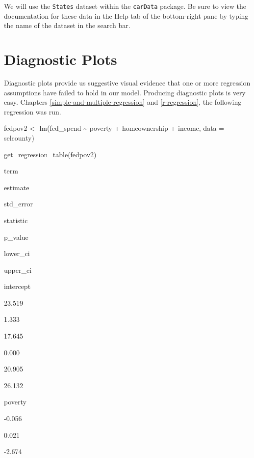 \documentclass[
]{book}
\makeatletter
\newenvironment{Shaded}{\begin{snugshade}}{\end{snugshade}}
\newcommand{\AttributeTok}[1]{\textcolor[rgb]{0.61,0.61,0.61}{#1}}
\newcommand{\FunctionTok}[1]{\textcolor[rgb]{0,0,0}{#1}}
\newcommand{\NormalTok}[1]{#1}
\newcommand{\OtherTok}[1]{\textcolor[rgb]{0.37,0.37,0.37}{#1}}
\newcommand{\SpecialCharTok}[1]{\textcolor[rgb]{0,0,0}{#1}}
\newenvironment{kframe}{%
\medskip{}
\setlength{\fboxsep}{.8em}
 \def\at@end@of@kframe{}%
 \ifinner\ifhmode%
  \def\at@end@of@kframe{\end{minipage}}%
  \begin{minipage}{\columnwidth}%
 \fi\fi%
 \def\FrameCommand##1{\hskip\@totalleftmargin \hskip-\fboxsep
 \colorbox{shadecolor}{##1}\hskip-\fboxsep
     \hskip-\linewidth \hskip-\@totalleftmargin \hskip\columnwidth}%
 \MakeFramed {\advance\hsize-\width
   \@totalleftmargin\z@ \linewidth\hsize
   \@setminipage}}%
 {\par\unskip\endMakeFramed%
 \at@end@of@kframe}
\renewenvironment{Shaded}{\begin{kframe}}{\end{kframe}}
\makeatother
\begin{document}
We will use the \texttt{States} dataset within the \texttt{carData} package. Be sure to view the documentation for these data in the Help tab of the bottom-right pane by typing the name of the dataset in the search bar.

\hypertarget{diagnostic-plots}{%
\section{Diagnostic Plots}\label{diagnostic-plots}}

Diagnostic plots provide us suggestive visual evidence that one or more regression assumptions have failed to hold in our model. Producing diagnostic plots is very easy. Chapters \ref{simple-and-multiple-regression} and \ref{r-regression}, the following regression was run.

\begin{Shaded}
\begin{Highlighting}[]
\NormalTok{fedpov2 }\OtherTok{\textless{}{-}} \FunctionTok{lm}\NormalTok{(fed\_spend }\SpecialCharTok{\textasciitilde{}}\NormalTok{ poverty }\SpecialCharTok{+}\NormalTok{ homeownership }\SpecialCharTok{+}\NormalTok{ income, }\AttributeTok{data =}\NormalTok{ selcounty)}
\end{Highlighting}
\end{Shaded}

\begin{Shaded}
\begin{Highlighting}[]
\FunctionTok{get\_regression\_table}\NormalTok{(fedpov2)}
\end{Highlighting}
\end{Shaded}

term

estimate

std\_error

statistic

p\_value

lower\_ci

upper\_ci

intercept

23.519

1.333

17.645

0.000

20.905

26.132

poverty

-0.056

0.021

-2.674
\end{document}
